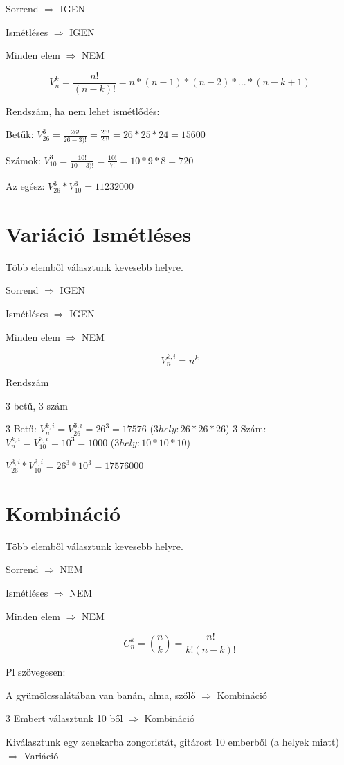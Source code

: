 \documentclass[paper=a4,
fontsize=2.2mm]{scrartcl} \addtokomafont{sectioning}{\rmfamily}
\begin{document}
Sorrend $\Rightarrow$ IGEN

Ismétléses $\Rightarrow$ IGEN

Minden elem $\Rightarrow$ NEM


$$V_n^k = \frac{n!}{(n - k)!} = n * (n - 1) * (n - 2) * ... * (n - k + 1)$$

Rendszám, ha nem lehet ismétlődés:

Betűk: $V_{26}^3 = \frac{26!}{26 - 3)!} = \frac{26!}{23!} = 26 * 25 * 24 = 15600$

Számok: $V_{10}^3 = \frac{10!}{10 - 3)!} = \frac{10!}{7!} = 10 * 9 * 8 = 720$

Az egész: $V_{26}^3 * V_{10}^3 = 11232000$

\section{Variáció Ismétléses}

Több elemből választunk kevesebb helyre.

Sorrend $\Rightarrow$ IGEN

Ismétléses $\Rightarrow$ IGEN

Minden elem $\Rightarrow$ NEM


$$V_n^{k, i} = n^k$$

Rendszám

3 betű, 3 szám

3 Betű: $V_n^{k, i} = V_{26}^{3, i} = 26^3 =  17576$ ($3 hely : 26 * 26 * 26$)
3 Szám: $V_n^{k, i} = V_{10}^{3, i} = 10^3 =  1000$ ($3 hely : 10 * 10 * 10$)

$V_{26}^{3, i} * V_{10}^{3, i} = 26^3 * 10^3 = 17576000$

\section{Kombináció}

Több elemből választunk kevesebb helyre.

Sorrend $\Rightarrow$ NEM

Ismétléses $\Rightarrow$ NEM

Minden elem $\Rightarrow$ NEM


$$C_n^k = {{n}\choose{k}} = \frac{n!}{k!(n - k)!} $$

Pl szövegesen:

A gyümölcssalátában van banán, alma, szőlő $\Rightarrow$ Kombináció

3 Embert választunk 10 ből $\Rightarrow$ Kombináció

Kiválasztunk egy zenekarba zongoristát, gitárost 10 emberből (a helyek miatt) $\Rightarrow$ Variáció
\end{document}
